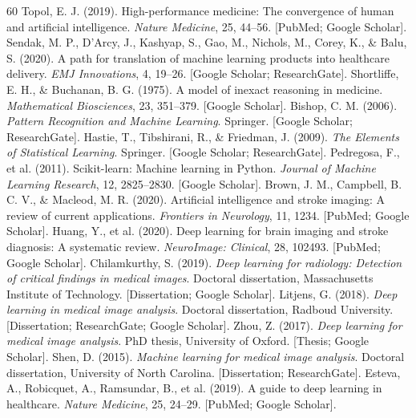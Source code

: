 \documentclass[10pt,a4paper]{article}
\begin{document}
\begin{thebibliography}{60}
 Topol, E. J. (2019). High-performance medicine: The convergence of human and artificial intelligence. \textit{Nature Medicine}, 25, 44--56. [PubMed; Google Scholar].
 Sendak, M. P., D'Arcy, J., Kashyap, S., Gao, M., Nichols, M., Corey, K., \& Balu, S. (2020). A path for translation of machine learning products into healthcare delivery. \textit{EMJ Innovations}, 4, 19--26. [Google Scholar; ResearchGate].
 Shortliffe, E. H., \& Buchanan, B. G. (1975). A model of inexact reasoning in medicine. \textit{Mathematical Biosciences}, 23, 351--379. [Google Scholar].
 Bishop, C. M. (2006). \textit{Pattern Recognition and Machine Learning}. Springer. [Google Scholar; ResearchGate].
 Hastie, T., Tibshirani, R., \& Friedman, J. (2009). \textit{The Elements of Statistical Learning}. Springer. [Google Scholar; ResearchGate].
 Pedregosa, F., et al. (2011). Scikit-learn: Machine learning in Python. \textit{Journal of Machine Learning Research}, 12, 2825--2830. [Google Scholar].
 Brown, J. M., Campbell, B. C. V., \& Macleod, M. R. (2020). Artificial intelligence and stroke imaging: A review of current applications. \textit{Frontiers in Neurology}, 11, 1234. [PubMed; Google Scholar].
 Huang, Y., et al. (2020). Deep learning for brain imaging and stroke diagnosis: A systematic review. \textit{NeuroImage: Clinical}, 28, 102493. [PubMed; Google Scholar].
 Chilamkurthy, S. (2019). \textit{Deep learning for radiology: Detection of critical findings in medical images}. Doctoral dissertation, Massachusetts Institute of Technology. [Dissertation; Google Scholar].
 Litjens, G. (2018). \textit{Deep learning in medical image analysis}. Doctoral dissertation, Radboud University. [Dissertation; ResearchGate; Google Scholar].
 Zhou, Z. (2017). \textit{Deep learning for medical image analysis}. PhD thesis, University of Oxford. [Thesis; Google Scholar].
 Shen, D. (2015). \textit{Machine learning for medical image analysis}. Doctoral dissertation, University of North Carolina. [Dissertation; ResearchGate].
 Esteva, A., Robicquet, A., Ramsundar, B., et al. (2019). A guide to deep learning in healthcare. \textit{Nature Medicine}, 25, 24--29. [PubMed; Google Scholar].

\end{thebibliography}
\end{document}
